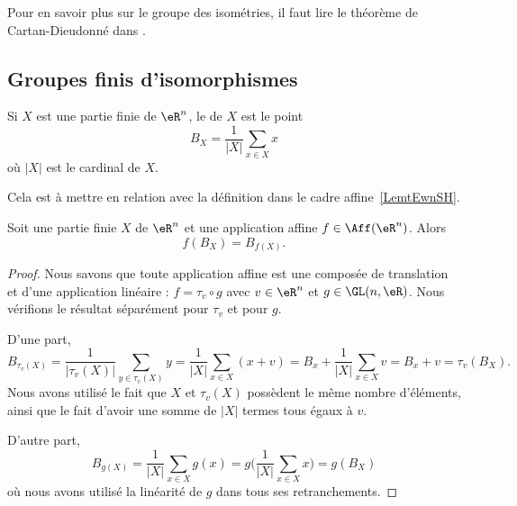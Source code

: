 Pour en savoir plus sur le groupe des isométries, il faut lire le théorème de Cartan-Dieudonné dans \cite{JGAdTA}.

\subsection{Groupes finis d'isomorphismes}

\begin{definition}
    Si \( X\) est une partie finie de \( \eR^n\), le  de \( X\) est le point
    \begin{equation}
        B_X=\frac{1}{ | X | }\sum_{x\in X}x
    \end{equation}
    où \( | X |\) est le cardinal de \( X\).
\end{definition}
Cela est à mettre en relation avec la définition dans le cadre affine~\ref{LemtEwnSH}.

\begin{lemma}
    Soit une partie finie \( X\) de \( \eR^n\) et une application affine \( f\in\Aff(\eR^n)\). Alors
    \begin{equation}
        f(B_X)=B_{f(X)}.
    \end{equation}
\end{lemma}

\begin{proof}
    Nous savons que toute application affine est une composée de translation et d'une application linéaire : \( f=\tau_v\circ g\) avec \( v\in \eR^n\) et \( g\in \GL(n,\eR)\). Nous vérifions le résultat séparément pour \( \tau_v\) et pour \( g\).

    D'une part,
    \begin{equation}
        B_{\tau_v(X)}=\frac{1}{ | \tau_v(X) | }\sum_{y\in \tau_v(X)}y=\frac{1}{ | X | }\sum_{x\in X}(x+v)=B_x+\frac{1}{ | X | }\sum_{x\in X}v=B_x+v=\tau_v(B_X).
    \end{equation}
    Nous avons utilisé le fait que \( X\) et \( \tau_v(X)\) possèdent le même nombre d'éléments, ainsi que le fait d'avoir une somme de \( | X |\) termes tous égaux à \( v\).

    D'autre part,
    \begin{equation}
        B_{g(X)}=\frac{1}{ | X | }\sum_{x\in X}g(x)=g\big( \frac{1}{ |X | }\sum_{x\in X}x \big)=g(B_X)
    \end{equation}
    où nous avons utilisé la linéarité de \( g\) dans tous ses retranchements.
\end{proof}

